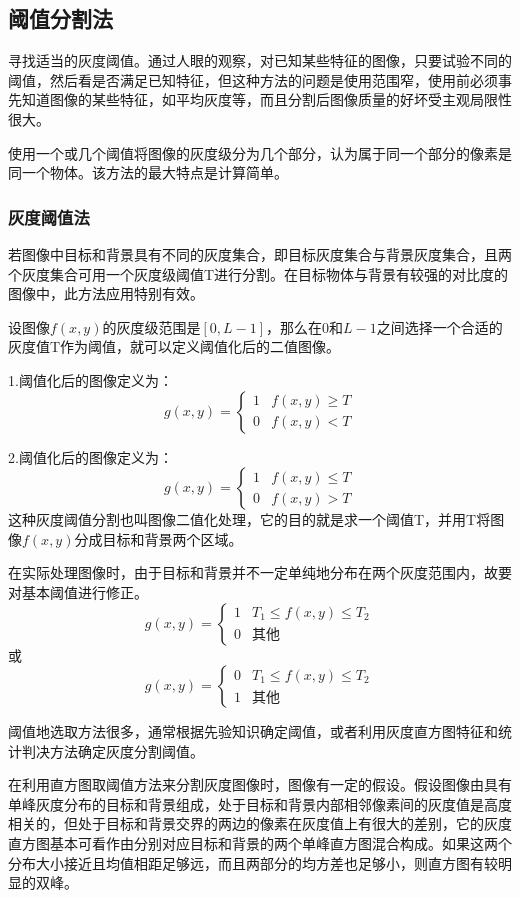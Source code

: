 \documentclass[11pt]{article}
\begin{document}
\subsection{阈值分割法}
寻找适当的灰度阈值。通过人眼的观察，对已知某些特征的图像，只要试验不同的阈值，然后看是否满足已知特征，但这种方法的问题是使用范围窄，使用前必须事先知道图像的某些特征，如平均灰度等，而且分割后图像质量的好坏受主观局限性很大。

使用一个或几个阈值将图像的灰度级分为几个部分，认为属于同一个部分的像素是同一个物体。该方法的最大特点是计算简单。

\subsubsection{灰度阈值法}
若图像中目标和背景具有不同的灰度集合，即目标灰度集合与背景灰度集合，且两个灰度集合可用一个灰度级阈值T进行分割。在目标物体与背景有较强的对比度的图像中，此方法应用特别有效。

设图像$f(x,y)$的灰度级范围是$[0,L-1]$，那么在0和$L-1$之间选择一个合适的灰度值T作为阈值，就可以定义阈值化后的二值图像。

1.阈值化后的图像定义为：
$$g(x,y) = \left\{\begin{matrix}
	1 &f(x,y) \geqslant T\\ 
	0 &f(x,y) < T
\end{matrix}\right.$$

2.阈值化后的图像定义为：
$$g(x,y) = \left\{\begin{matrix}
	1 &f(x,y) \leqslant T\\ 
	0 &f(x,y) > T
\end{matrix}\right.$$
这种灰度阈值分割也叫图像二值化处理，它的目的就是求一个阈值T，并用T将图像$f(x,y)$分成目标和背景两个区域。

在实际处理图像时，由于目标和背景并不一定单纯地分布在两个灰度范围内，故要对基本阈值进行修正。
$$g(x,y) = \left\{\begin{matrix}
	1 &T_1 \leqslant f(x,y) \leqslant T_2 \\ 
	0 &\text{其他}
\end{matrix}\right.$$
或
$$g(x,y) = \left\{\begin{matrix}
	0 &T_1 \leqslant f(x,y) \leqslant T_2 \\ 
	1 &\text{其他}
\end{matrix}\right.$$

阈值地选取方法很多，通常根据先验知识确定阈值，或者利用灰度直方图特征和统计判决方法确定灰度分割阈值。

在利用直方图取阈值方法来分割灰度图像时，图像有一定的假设。假设图像由具有单峰灰度分布的目标和背景组成，处于目标和背景内部相邻像素间的灰度值是高度相关的，但处于目标和背景交界的两边的像素在灰度值上有很大的差别，它的灰度直方图基本可看作由分别对应目标和背景的两个单峰直方图混合构成。如果这两个分布大小接近且均值相距足够远，而且两部分的均方差也足够小，则直方图有较明显的双峰。
\end{document}
